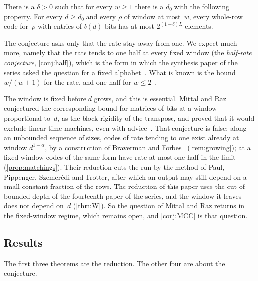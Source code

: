 \begin{conjecture}\label{conj:MCC}
There is a $\delta>0$ such that for every $w\ge1$ there is a $d_0$ with the following property. For every $d\ge d_0$
and every $\rho$ of window at most~$w$, every whole-row code for~$\rho$ with entries of $b(d)$ bits has at most
$2^{(1-\delta)L}$ elements.
\end{conjecture}

The conjecture asks only that the rate stay away from one. We expect much more, namely that the rate tends to one half
at every fixed window (the \emph{half-rate conjecture}, \cref{conj:half}), which is the form in which the synthesis
paper of the series asked the question for a fixed alphabet~\cite[Problem~9.4(c)]{SeventeenthPaper2026}. What is known
is the bound $w/(w+1)$ for the rate, and one half for $w\le2$~\cite{SeventeenthPaper2026}.

The window is fixed before $d$ grows, and this is essential. Mittal and Raz conjectured the corresponding bound for
matrices of bits at a window proportional to~$d$, as the block rigidity of the transpose, and proved that it would
exclude linear-time machines, even with advice~\cite[Theorem~29 and Conjecture~36]{MittalRaz2021}. That conjecture
is false: along an unbounded sequence of sizes, codes of rate tending to one exist already at window $d^{1-\alpha}$,
by a construction of Braverman and Forbes~\cite[Proposition~10.8.3]{Mittal2025} (\cref{rem:growing}); at a fixed window codes of the same form have
rate at most one half in the limit (\cref{prop:matchings}). Their reduction cuts the run by the method of
Paul, Pippenger, Szemer\'edi and Trotter, after which an output may still depend on a small constant fraction of
the rows.
The reduction of this paper uses the cut of bounded depth of the fourteenth paper of the series, and the window it
leaves does not depend on~$d$ (\cref{thm:W}). So the question of Mittal and Raz returns in the fixed-window regime, which remains open,
and \cref{conj:MCC} is that question.

\subsection{Results}\label{sec:intro-results}

The first three theorems are the reduction. The other four are about the conjecture.

